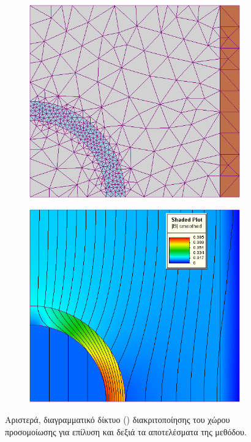 \begin{figure}[h]
  \begin{subfigure}{.5\textwidth}
    \centering
    \includegraphics[width=\textwidth]{figures/fem-mesh.png}
  \end{subfigure}
  \begin{subfigure}{.5\textwidth}
    \centering
    \includegraphics[width=\textwidth]{figures/fem-solution.png}
  \end{subfigure}
  \caption[Παράδειγμα ]{Αριστερά, διαγραμματικό δίκτυο ()
    διακριτοποίησης του χώρου προσομοίωσης για επίλυση  και δεξιά τα αποτελέσματα
    της μεθόδου.}
  \label{fig:fem}
\end{figure}


